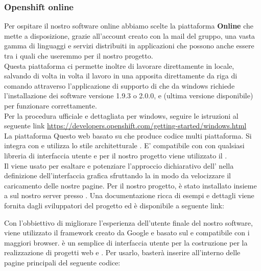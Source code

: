 \documentclass[a4paper,11pt]{article}
\begin{document}
			\subsubsection{Openshift online} \label{s:openshift}
			Per ospitare il nostro software online abbiamo scelte la piattaforma \textbf{ Online } che mette a disposizione, grazie all'account creato con la mail del gruppo, una vasta gamma di linguaggi e servizi distribuiti in applicazioni che possono anche essere  tra i quali  che useremmo per il nostro progetto.\\
			Questa piattaforma ci permette inoltre di lavorare direttamente in locale, salvando di volta in volta il lavoro in una apposita  direttamente da riga di comando attraverso l'applicazione di supporto di   che da windows richiede l'installazione dei software  versione 1.9.3 o 2.0.0,   e (ultima versione disponibile)  per funzionare correttamente.\\
			Per la procedura ufficiale e dettagliata per windows, seguire le istruzioni al seguente link \url{https://developers.openshift.com/getting-started/windows.html} \\
			
			
			 \label{s:meteor}
			La piattaforma  Questo  web basato su  che produce codice  multi piattaforma. Si integra con  e utilizza lo stile architetturale . E' compatibile con con qualsiasi libreria  di interfaccia utente e per il nostro progetto viene utilizzato il  .\\
			
			\label{s:angular}
			Il   viene usato per esaltare e potenziare l'approccio dichiarativo dell' nella definizione dell'interfaccia grafica sfruttando la  in modo da velocizzare il caricamento delle nostre pagine. Per il nostro progetto,  è stato installato insieme a  sul nostro server presso . Una documentazione ricca di esempi e dettagli viene fornita dagli sviluppatori del progetto ed è disponibile a seguente link: \url{}
			
			Con l'obbiettivo di migliorare l'esperienza dell'utente finale del nostro software, viene utilizzato il framework  creato da Google e basato sul  e compatibile con i maggiori browser.  è un semplice  di interfaccia utente  per la costruzione per la realizzazione di progetti web  e . Per usarlo, basterà inserire all'interno delle pagine  principali del seguente codice: \\
			\\
			
\end{document}
